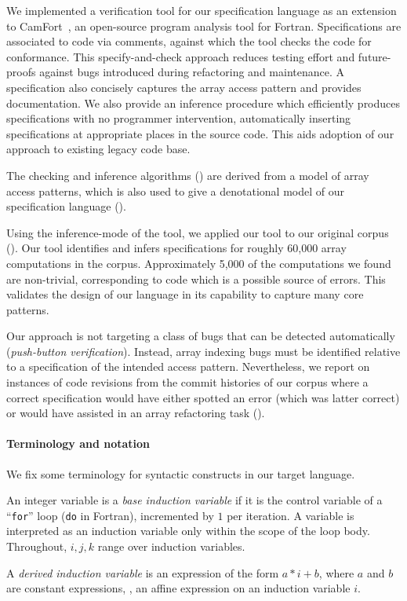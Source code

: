 We implemented a verification tool for our specification language as
an extension to CamFort~\cite{camfort}, an open-source program
analysis tool for Fortran. Specifications are associated to code via
comments, against which the tool checks the code for conformance. This
specify-and-check approach reduces testing effort and future-proofs
against bugs introduced during refactoring and maintenance. A
specification also concisely captures the array access pattern
and provides documentation. We also provide an inference procedure
which efficiently produces specifications with no programmer
intervention, automatically inserting specifications at appropriate
places in the source code. This aids adoption of our approach to
existing legacy code base.

The checking and inference algorithms () are
derived from a model of array access patterns, which is also used to
give a denotational model of our specification language
().

Using the inference-mode of the tool, we applied our tool to our
original corpus (). Our tool identifies and
infers specifications for roughly 60,000 array computations in the
corpus. Approximately 5,000 of the computations we found are non-trivial,
corresponding to code which is a possible source of errors. This
validates the design of our language in its capability to capture many
core patterns.

Our approach is not targeting a class of bugs that can be detected
automatically (\emph{push-button verification}). Instead, array
indexing bugs must be identified relative to a specification of the
intended access pattern.  Nevertheless, we report on instances of code
revisions from the commit histories of our corpus where a
correct specification would have either spotted an error (which was
latter correct) or would have assisted in an array refactoring task
().

\paragraph{Terminology and notation}

We fix some terminology for syntactic constructs in our target language.

\begin{defn}
  An integer variable is a \emph{base induction variable} if it is the
  control variable of a ``\texttt{for}'' loop (\texttt{do} in
  Fortran), incremented by $1$ per iteration. A variable is
  interpreted as an induction variable only within the scope of the
  loop body. Throughout, $i, j, k$ range over induction variables.

  A \emph{derived induction variable} is an expression of the form
  $a \ast i + b$, where $a$ and $b$ are constant expressions, \ie{},
  an affine expression on an induction variable $i$.
\end{defn}

